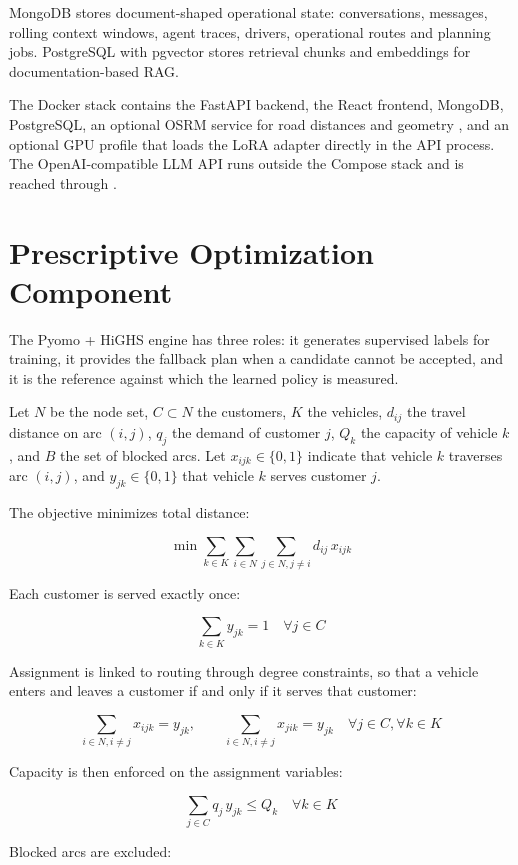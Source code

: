\documentclass[11pt,a4paper]{article}
\begin{document}
MongoDB stores document-shaped operational state: conversations, messages, rolling context windows,
agent traces, drivers, operational routes and planning jobs. PostgreSQL with pgvector stores
retrieval chunks and embeddings for documentation-based RAG.

The Docker stack contains the FastAPI backend, the React frontend, MongoDB, PostgreSQL, an optional
OSRM service for road distances and geometry \cite{osrm}, and an optional GPU profile that loads the
LoRA adapter directly in the API process. The OpenAI-compatible LLM API runs outside the Compose
stack and is reached through .

\section{Prescriptive Optimization Component}

The Pyomo + HiGHS engine has three roles: it generates supervised labels for training, it provides
the fallback plan when a candidate cannot be accepted, and it is the reference against which the
learned policy is measured.

Let $N$ be the node set, $C \subset N$ the customers, $K$ the vehicles, $d_{ij}$ the travel distance
on arc $(i,j)$, $q_j$ the demand of customer $j$, $Q_k$ the capacity of vehicle $k$, and $B$ the set
of blocked arcs. Let $x_{ijk} \in \{0,1\}$ indicate that vehicle $k$ traverses arc $(i,j)$, and
$y_{jk} \in \{0,1\}$ that vehicle $k$ serves customer $j$.

The objective minimizes total distance:

\[
\min \sum_{k \in K} \sum_{i \in N} \sum_{j \in N, j \neq i} d_{ij}\, x_{ijk}
\]

Each customer is served exactly once:

\[
\sum_{k \in K} y_{jk} = 1
\quad \forall j \in C
\]

Assignment is linked to routing through degree constraints, so that a vehicle enters and leaves a
customer if and only if it serves that customer:

\[
\sum_{i \in N, i \neq j} x_{ijk} = y_{jk},
\qquad
\sum_{i \in N, i \neq j} x_{jik} = y_{jk}
\quad \forall j \in C, \forall k \in K
\]

Capacity is then enforced on the assignment variables:

\[
\sum_{j \in C} q_j\, y_{jk} \leq Q_k
\quad \forall k \in K
\]

Blocked arcs are excluded:
\end{document}
